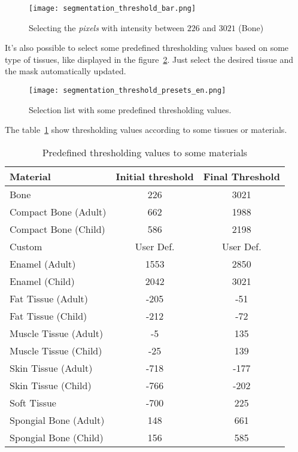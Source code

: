 \begin{figure}[!htb]
\centering
\texttt{[image: segmentation\_threshold\_bar.png]}
\caption{Selecting the \textit{pixels} with intensity between $226$ and $3021$ (Bone)}
\label{fig:region_selection_bar}
\end{figure}

It's also possible to select some predefined thresholding values based on some type of tissues, like displayed in the figure~\ref{fig:limiar_presets}. Just select the desired tissue and the mask automatically updated.

\begin{figure}[!htb]
\centering
\texttt{[image: segmentation\_threshold\_presets\_en.png]}
\caption{Selection list with some predefined thresholding values.}
\label{fig:limiar_presets}
\end{figure}

The table~\ref{tab:limiar} show thresholding values according to some tissues or materials.

\begin{table}[h]
\centering
\caption{Predefined thresholding values to some materials}
\begin{tabular}{lcc}\\
\hline %
Material & Initial threshold & Final Threshold\\
\hline
\hline
Bone & 226 & 3021\\
Compact Bone (Adult) & 662 & 1988\\
Compact Bone (Child) & 586 & 2198\\
Custom & User Def. & User Def.\\
Enamel (Adult) & 1553 & 2850\\
Enamel (Child) & 2042 & 3021\\
Fat Tissue (Adult) & -205 & -51\\
Fat Tissue (Child) & -212 & -72\\
Muscle Tissue (Adult) & -5 & 135\\
Muscle Tissue (Child) & -25 & 139\\
Skin Tissue (Adult) & -718 & -177\\
Skin Tissue (Child) & -766 & -202\\
Soft Tissue & -700 & 225\\
Spongial Bone (Adult) & 148 & 661\\
Spongial Bone (Child) & 156 & 585\\
\hline
\end{tabular}
\label{tab:limiar}
\end{table}
\newpage

